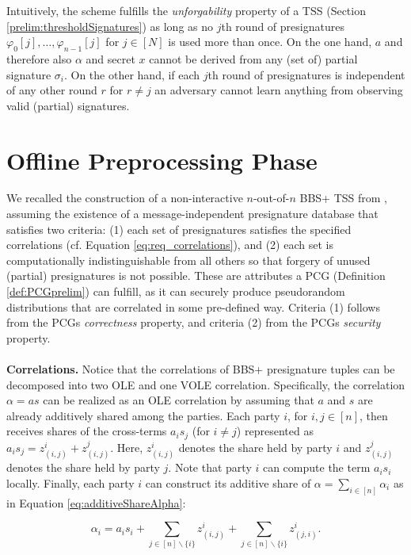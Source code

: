 Intuitively, the scheme fulfills the \textit{unforgability} property of a TSS (Section \ref{prelim:thresholdSignatures}) as long as no $j$th round of presignatures $\varphi_{0}[j], \ldots, \varphi_{n-1}[j]$ for $j \in [N]$  is used more than once. On the one hand, $a$ and therefore also $\alpha$ and secret $x$ cannot be derived from any (set of) partial signature $\sigma_i$. On the other hand, if each $j$th round of presignatures is independent of any other round $r$ for $r \neq j$ an adversary cannot learn anything from observing valid (partial) signatures.

\section{Offline Preprocessing Phase}
We recalled the construction of a non-interactive $n$-out-of-$n$ BBS+ TSS from \cite{cryptoeprint:2023/1076}, assuming the existence of a message-independent presignature database that satisfies two criteria: (1) each set of presignatures satisfies the specified correlations (cf. Equation \ref{eq:req_correlations}), and (2) each set is computationally indistinguishable from all others so that forgery of unused (partial) presignatures is not possible. These are attributes a PCG (Definition \ref{def:PCGprelim}) can fulfill, as it can securely produce pseudorandom distributions that are correlated in some pre-defined way. Criteria (1) follows from the PCGs \textit{correctness} property, and criteria (2) from the PCGs \textit{security} property.
\\\\
\textbf{Correlations.} Notice that the correlations of BBS+ presignature tuples can be decomposed into two OLE and one VOLE correlation. Specifically, the correlation $\alpha = as$ can be realized as an OLE correlation by assuming that $a$ and $s$ are already additively shared among the parties. Each party $i$, for $i, j \in [n]$, then receives shares of the cross-terms $a_is_j$ (for $i \neq j$) represented as  $a_is_j = z_{(i,j)}^i+z_{(i,j)}^j$. Here, $z_{(i,j)}^i$ denotes the share held by party $i$ and $z_{(i,j)}^j$ denotes the share held by party $j$. Note that party $i$ can compute the term $a_is_i$ locally. Finally, each party $i$ can construct its additive share of $\alpha = \sum_{i\in [n]}\alpha_i$ as in Equation \ref{eq:additiveShareAlpha}:

\begin{equation}
  \alpha_i=a_is_i + \sum_{j \in [n]\backslash \{i\}}{z_{(i,j)}^i} + \sum_{j \in [n]\backslash \{i\}}z_{(j,i)}^i.
  \label{eq:additiveShareAlpha}
\end{equation}


